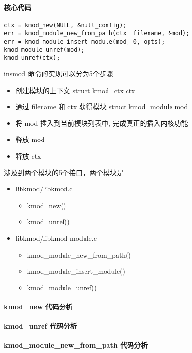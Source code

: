 \documentclass[11pt,a4paper]{article}
\begin{document}
\paragraph{核心代码}

{\begin{shaded}\begin{verbatim}
ctx = kmod_new(NULL, &null_config);
err = kmod_module_new_from_path(ctx, filename, &mod);
err = kmod_module_insert_module(mod, 0, opts);
kmod_module_unref(mod);
kmod_unref(ctx);
\end{verbatim}\end{shaded}}
insmod 命令的实现可以分为5个步骤

\begin{itemize}
\item
  创建模块的上下文 struct kmod\_ctx ctx
\item
  通过 filename 和 ctx 获得模块 struct kmod\_module mod
\item
  将 mod 插入到当前模块列表中, 完成真正的插入内核功能
\item
  释放 mod
\item
  释放 ctx
\end{itemize}
涉及到两个模块的5个接口，两个模块是

\begin{itemize}
\item
  libkmod/libkmod.c
  \begin{itemize}
  \item
    kmod\_new()
  \item
    kmod\_unref()
  \end{itemize}
\item
  libkmod/libkmod-module.c
  \begin{itemize}
  \item
    kmod\_module\_new\_from\_path()
  \item
    kmod\_module\_insert\_module()
  \item
    kmod\_module\_unref()
  \end{itemize}
\end{itemize}
\paragraph{kmod\_new 代码分析}

\paragraph{kmod\_unref 代码分析}

\paragraph{kmod\_module\_new\_from\_path 代码分析}
\end{document}
